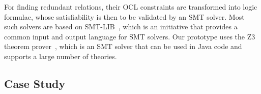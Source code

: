 
For finding redundant relations, their \gls{OCL} constraints are transformed into logic formulae, whose satisfiability is then to be validated by an \gls{SMT} solver.
Most such solvers are based on SMT-LIB~\cite{smtlib2017}, which is an initiative that provides a common input and output language for \gls{SMT} solvers.
Our prototype uses the Z3 theorem prover~\cite{z32008}, which is an \gls{SMT} solver that can be used in Java code and supports a large number of theories.





\subsection{Case Study}
\label{chap:correctness_evaluation:compatibility:case_study}

